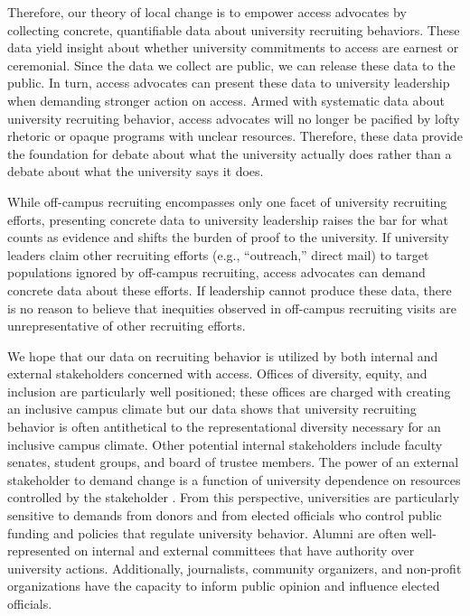 \documentclass[twoside]{article}
\begin{document}
Therefore, our theory of local change is to empower access advocates by collecting concrete, quantifiable data about university recruiting behaviors. These data yield insight about whether university commitments to access are earnest or ceremonial.  Since the data we collect are public, we can release these data to the public. In turn, access advocates can present these data to university leadership when demanding stronger action on access.  Armed with systematic data about university recruiting behavior, access advocates will no longer be pacified by lofty rhetoric or opaque programs with unclear resources.  Therefore, these data provide the foundation for debate about what the university actually does rather than a debate about what the university says it does.

While off-campus recruiting encompasses only one facet of university recruiting efforts, presenting concrete data to university leadership raises the bar for what counts as evidence and shifts the burden of proof to the university. If university leaders claim other recruiting efforts (e.g., ``outreach,''  direct mail) to target populations ignored by off-campus recruiting, access advocates can demand concrete data about these efforts. If leadership cannot produce these data, there is no reason to believe that inequities observed in off-campus recruiting visits are unrepresentative of other recruiting efforts.

We hope that our data on recruiting behavior is utilized by both internal and external stakeholders concerned with access.  Offices of diversity, equity, and inclusion are particularly well positioned; these offices are charged with creating an inclusive campus climate but our data shows that university recruiting behavior is often antithetical to the representational diversity necessary for an inclusive campus climate.  Other potential internal stakeholders include faculty senates, student groups, and board of trustee members.  The power of an external stakeholder to demand change is a function of university dependence on resources controlled by the stakeholder \citep{RN959}. From this perspective, universities are particularly sensitive to demands from donors and from elected officials who control public funding and policies that regulate university behavior.  Alumni are often well-represented on internal and external committees that have authority over university actions.  Additionally, journalists, community organizers, and non-profit organizations have the capacity to inform public opinion and influence elected officials.
\end{document}
